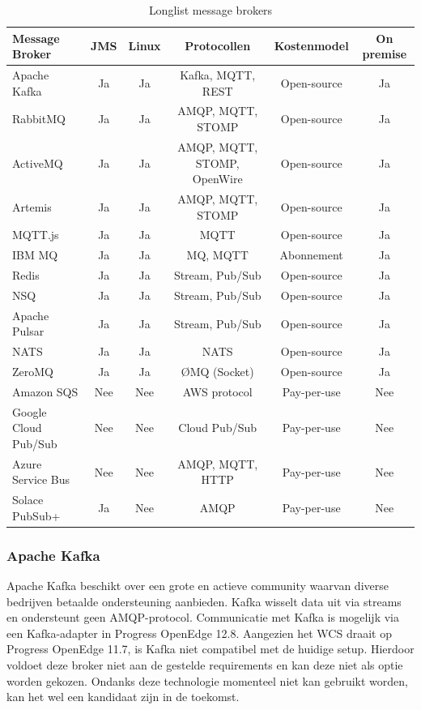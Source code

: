 \begin{table}[h!]
\footnotesize
\centering
\begin{tabular}{|l|c|c|c|c|c|}
\hline
Message Broker & JMS & Linux & Protocollen & Kostenmodel & On premise \\
\hline
Apache Kafka & Ja & Ja & Kafka, MQTT, REST & Open-source & Ja \\
\hline
RabbitMQ & Ja & Ja & AMQP, MQTT, STOMP & Open-source & Ja \\
\hline
ActiveMQ & Ja & Ja & AMQP, MQTT, STOMP, OpenWire & Open-source & Ja \\ 
\hline
Artemis & Ja & Ja & AMQP, MQTT, STOMP & Open-source & Ja \\
\hline
MQTT.js & Ja & Ja & MQTT & Open-source & Ja \\
\hline
IBM MQ & Ja & Ja & MQ, MQTT & Abonnement & Ja \\
\hline
Redis & Ja & Ja & Stream, Pub/Sub & Open-source & Ja \\
\hline
NSQ & Ja & Ja & Stream, Pub/Sub & Open-source & Ja \\
\hline
Apache Pulsar & Ja & Ja & Stream, Pub/Sub & Open-source & Ja \\
\hline
NATS & Ja & Ja & NATS & Open-source & Ja \\
\hline
ZeroMQ & Ja & Ja & ØMQ (Socket) & Open-source & Ja \\ 
\hline
Amazon SQS & Nee & Nee & AWS protocol & Pay-per-use & Nee \\
\hline
Google Cloud Pub/Sub & Nee & Nee & Cloud Pub/Sub & Pay-per-use & Nee \\
\hline
Azure Service Bus & Nee & Nee & AMQP, MQTT, HTTP & Pay-per-use & Nee \\
\hline
Solace PubSub+ & Ja & Nee & AMQP & Pay-per-use & Nee \\
\hline
\end{tabular}
\caption{\label{tab:message_brokers}Longlist message brokers}
\end{table}

\subsubsection{Apache Kafka}
Apache Kafka beschikt over een grote en actieve community waarvan diverse bedrijven betaalde ondersteuning aanbieden.
Kafka wisselt data uit via streams en ondersteunt geen AMQP-protocol. 
Communicatie met Kafka is mogelijk via een Kafka-adapter in Progress OpenEdge 12.8.
Aangezien het WCS draait op Progress OpenEdge 11.7, is Kafka niet compatibel met de huidige setup.
Hierdoor voldoet deze broker niet aan de gestelde requirements en kan deze niet als optie worden gekozen.
Ondanks deze technologie momenteel niet kan gebruikt worden, kan het wel een kandidaat zijn in de toekomst.

